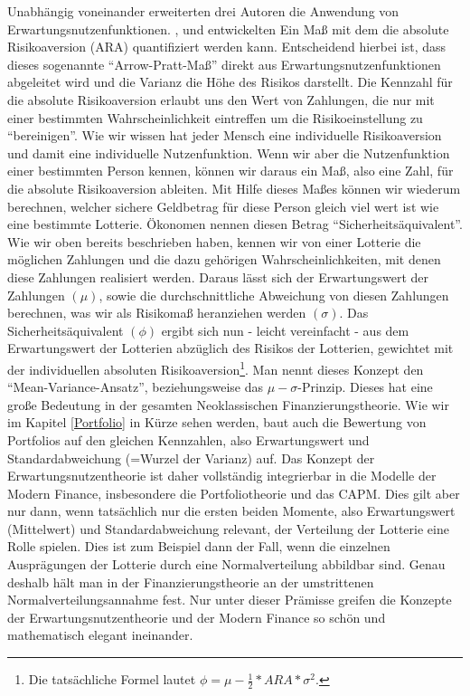 Unabhängig voneinander erweiterten drei Autoren die Anwendung von Erwartungsnutzenfunktionen. \textcite{DeFinetti1952}, \textcite{Arrow1963} und \textcite{Pratt1964} entwickelten Ein Maß mit dem die absolute Risikoaversion (ARA) quantifiziert werden kann. Entscheidend hierbei ist, dass dieses sogenannte "`Arrow-Pratt-Maß"' direkt aus Erwartungsnutzenfunktionen abgeleitet wird und die Varianz die Höhe des Risikos darstellt. Die Kennzahl für die absolute Risikoaversion erlaubt uns den Wert von Zahlungen, die nur mit einer bestimmten Wahrscheinlichkeit eintreffen um die Risikoeinstellung zu "`bereinigen"'. Wie wir wissen hat jeder Mensch eine individuelle Risikoaversion und damit eine individuelle Nutzenfunktion. Wenn wir aber die Nutzenfunktion einer bestimmten Person kennen, können wir daraus ein Maß, also eine Zahl, für die absolute Risikoaversion ableiten. Mit Hilfe dieses Maßes können wir wiederum berechnen, welcher sichere Geldbetrag für diese Person gleich viel wert ist wie eine bestimmte Lotterie. Ökonomen nennen diesen Betrag "`Sicherheitsäquivalent"'. Wie wir oben bereits beschrieben haben, kennen wir von einer Lotterie die möglichen Zahlungen und die dazu gehörigen Wahrscheinlichkeiten, mit denen diese Zahlungen realisiert werden. Daraus lässt sich der Erwartungswert der Zahlungen $(\mu)$, sowie die durchschnittliche Abweichung von diesen Zahlungen berechnen, was wir als Risikomaß heranziehen werden $(\sigma)$. Das Sicherheitsäquivalent $(\phi)$ ergibt sich nun - leicht vereinfacht - aus dem Erwartungswert der Lotterien abzüglich des Risikos der Lotterien, gewichtet mit der individuellen absoluten Risikoaversion\footnote{Die tatsächliche Formel lautet $\phi = \mu - \frac{1}{2}*ARA*\sigma^2$.}. Man nennt dieses Konzept den "`Mean-Variance-Ansatz"', beziehungsweise das $\mu-\sigma$-Prinzip. Dieses hat eine große Bedeutung in der gesamten Neoklassischen Finanzierungstheorie. Wie wir im Kapitel \ref{Portfolio} in Kürze sehen werden, baut auch die Bewertung von Portfolios auf den gleichen Kennzahlen, also Erwartungswert und Standardabweichung (=Wurzel der Varianz) auf. Das Konzept der Erwartungsnutzentheorie ist daher vollständig integrierbar in die Modelle der Modern Finance, insbesondere die Portfoliotheorie und das CAPM. Dies gilt aber nur dann, wenn tatsächlich nur die ersten beiden Momente, also Erwartungswert (Mittelwert) und Standardabweichung relevant, der Verteilung der Lotterie eine Rolle spielen. Dies ist zum Beispiel dann der Fall, wenn die einzelnen Ausprägungen der Lotterie durch eine Normalverteilung abbildbar sind. Genau deshalb hält man in der Finanzierungstheorie an der umstrittenen Normalverteilungsannahme fest. Nur unter dieser Prämisse greifen die Konzepte der Erwartungsnutzentheorie und der Modern Finance so schön und mathematisch elegant ineinander.


